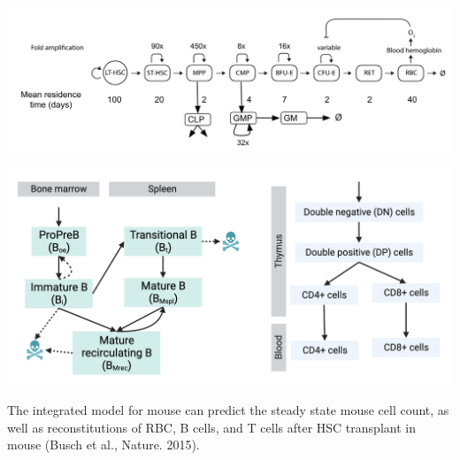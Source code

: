 \documentclass[a0paper,portrait]{baposter}
\begin{document}
\begin{poster}
{\begin{minipage}[b]{0.55\linewidth}
\centering
\includegraphics[width=\textwidth]{../img/mouse_full_model.png}
\end{minipage}
\hspace{0.5cm}
\begin{minipage}[b]{0.4\linewidth}
\centering
\includegraphics[width=\textwidth]{../img/Diagram_B_T.png}
\end{minipage}

The integrated model for mouse can predict the steady state mouse cell count, as well as reconstitutions of RBC, B cells, and T cells after HSC transplant in mouse (Busch et al., Nature. 2015).  

}
\end{poster}
\end{document}
